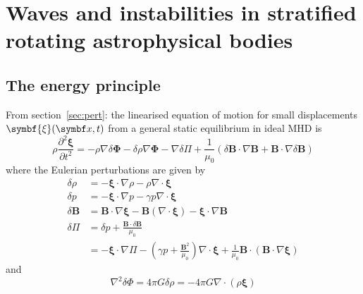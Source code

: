\documentclass{jknotes}
\newcommand{\B}{\symbf{B}}
\newcommand{\flux}{\symbf{\Phi}}
\newcommand{\disp}{\symbf{\xi}}
\begin{document}
\section{Waves and instabilities in stratified rotating astrophysical bodies}
\subsection{The energy principle}
From section~\ref{sec:pert}: the linearised equation of motion for small
displacements $\disp(\x,t)$ from a general static equilibrium in ideal MHD is
\begin{equation}
	\rho \frac{\partial^2 \disp}{\partial t^2} = -\rho \nabla \delta \flux -
	\delta \rho \nabla \flux - \nabla \delta \Pi + \frac{1}{\mu_0}(\delta \B
	\cdot \nabla \B + \B \cdot \nabla \delta \B)
\end{equation}
where the Eulerian perturbations are given by
\begin{align}
	\delta \rho &= -\disp \cdot \nabla \rho - \rho \nabla \cdot \disp \\
	\delta p &= -\disp \cdot \nabla p - \gamma p \nabla \cdot \disp \\
	\delta \B &= \B \cdot \nabla \disp - \B (\nabla \cdot \disp) - \disp \cdot
			  \nabla \B\\
	\delta \Pi &= \delta p + \frac{\B \cdot \delta \B}{\mu_0} \\
			   &= -\disp \cdot \nabla \Pi - \left( \gamma p +
			   \frac{\B^2}{\mu_0}\right) \nabla \cdot \disp + \frac{1}{\mu_0}
			   \B \cdot (\B \cdot \nabla \disp)
\end{align}
and 
\begin{equation}
	\nabla^2 \delta \Phi = 4\pi G \delta \rho = -4\pi G \nabla \cdot (\rho
	\disp)
\end{equation}
\end{document}
